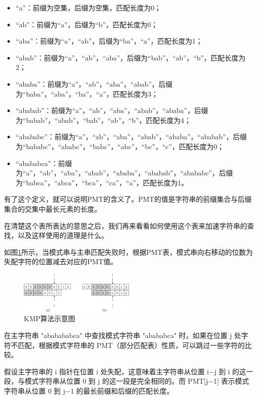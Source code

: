 \documentclass[lang=cn,newtx,10pt,scheme=chinese]{../elegantbook}
\begin{document}
\begin{itemize}
  \item “a”：前缀为空集，后缀为空集，匹配长度为0；
  \item “ab”：前缀为{“a”}，后缀为{“b”}，匹配长度为0；
  \item “aba”：前缀为{“a”，“ab”}，后缀为{“ba”，“a”}，匹配长度为1；
  \item “abab”：前缀为{“a”，“ab”，“aba”}，后缀为{“bab”，“ab”，“b”}，匹配长度为2；
  \item “ababa”：前缀为{“a”，“ab”，“aba”，“abab”}，后缀为{“baba”，“aba”，“ba”，“a”}，匹配长度为3；
  \item “ababab”：前缀为{“a”，“ab”，“aba”，“abab”，“ababa”}，后缀为{“babab”，“abab”，“bab”，“ab”，“b”}，匹配长度为4；
  \item “abababc”：前缀为{“a”，“ab”，“aba”，“abab”，“ababa”，“ababab”}，后缀为{“bababc”，“ababc”，“babc”，“abc”，“bc”，“c”}，匹配长度为0；
  \item “abababca”：前缀为{“a”，“ab”，“aba”，“abab”，“ababa”，“ababab”，“abababc”}，后缀为{“babca”，“abca”，“bca”，“ca”，“a”}，匹配长度为1。
\end{itemize}

有了这个定义，就可以说明PMT的含义了。PMT的值是字符串的前缀集合与后缀集合的交集中最长元素的长度。


在清楚这个表所表达的意思之后，我们再来看看如何使用这个表来加速字符串的查找，以及这样使用的道理是什么。

如图\ref{fig:KMP}所示，当模式串与主串匹配失败时，根据PMT表，模式串向右移动的位数为失配字符的位置减去对应的PMT值。

\begin{figure}[h]
  \centering
  \includegraphics[width=0.5\textwidth]{./figure/pdf/cropped/KMP.pdf}
  \caption{KMP算法示意图}
  \label{fig:KMP}

\end{figure}

在主字符串 "ababababca" 中查找模式字符串 "abababca" 时，如果在位置 j 处字符不匹配，根据模式字符串的 PMT（部分匹配表）性质，可以跳过一些字符的比较。

假设主字符串的 i 指针在位置 i 处失配，这意味着主字符串从位置 i−j 到 i 的这一段，与模式字符串从位置 0 到 j 的这一段是完全相同的。而 PMT[j−1] 表示模式字符串从位置 0 到 j−1 的最长前缀和后缀的匹配长度。
\end{document}

